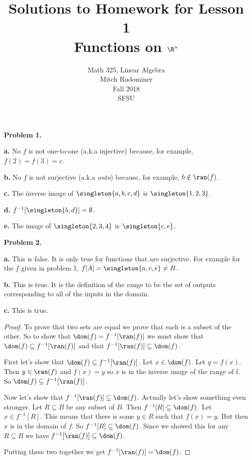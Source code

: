 \documentclass[oneside,12pt]{amsart}
\begin{document}
\title{Solutions to Homework for Lesson 1 \\ Functions on $\R^n$}
\author{Math 325, Linear Algebra \\ Mitch Rudominer \\ Fall 2018 \\ SFSU }
\date{}

\maketitle


\textbf{Problem 1.}

\textbf{a.} No $f$ is not one-to-one (a.k.a injective) because, for example,
$f(2) = f(3) = c$.

\textbf{b.} No $f$ is not surjective (a.k.a \emph{onto}) because, for example,
$b\notin\ran(f)$.

\textbf{c.} The inverse image of $\singleton{a,b,c,d}$ is $\singleton{1,2,3}$.

\textbf{d.} $f^{-1}[\singleton{b, d}] = \emptyset$.


\textbf{e.} The image of $\singleton{2,3,4}$ is $\singleton{c, e}$.

\medskip

\textbf{Problem 2.}

\textbf{a.} This is false. It is only true for functions that are surjective.
For example for the $f$ given in problem 1,  $f[A] = \singleton{a,c,e} \not= B$.

\textbf{b.} This is true. It is the definition of the range to be the set of
outputs corresponding to all of the inputs in the domain.

\textbf{c.} This is true.
\begin{proof}
To prove that two sets are equal we prove that each is a subset of the other.
So to show that $\dom(f) = f^{-1}[\ran(f)]$ we must show that
$\dom(f)\subseteq f^{-1}[\ran(f)]$ and that $f^{-1}[\ran(f)] \subseteq \dom(f)$.

First let's show that $\dom(f)\subseteq f^{-1}[\ran(f)]$. Let $x\in\dom(f)$.
Let $y=f(x)$. Then $y\in\ran(f)$ and $f(x) = y$ so $x$ is in the inverse image
of the range of f. So $\dom(f)\subseteq f^{-1}[\ran(f)]$.

Now let's show that $f^{-1}[\ran(f)] \subseteq \dom(f)$. Actually let's show
something even stronger. Let $R\subseteq B$ be any subset of $B$. Then
$f^{-1}[R] \subseteq \dom(f)$. Let $x\in f^{-1}[R]$.
This means that there is some $y\in R$ such that $f(x) = y$. But then
$x$ is in the domain of $f$. So $f^{-1}[R] \subseteq \dom(f)$. Since we showed
this for any $R\subseteq B$ we have $f^{-1}[\ran(f)] \subseteq \dom(f)$.

Putting these two together we get $f^{-1}[\ran(f)] = \dom(f)$.
\end{proof}
\end{document}
